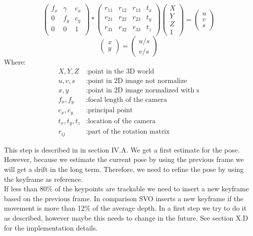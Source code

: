 \documentclass[11pt,a4paper,titlepage,oneside]{report}
\begin{document}
\begin{equation}\label{eq:cm}
  \begin{pmatrix}
		f_x & \gamma & c_x \\
		0 & f_y & c_y \\
		0 & 0 & 1 \\
	\end{pmatrix}*
	\begin{pmatrix}
		r_{11} & r_{12} & r_{13} & t_x \\
		r_{21} & r_{22} & r_{23} & t_y \\
		r_{31} & r_{32} & r_{33} & t_z \\
	\end{pmatrix}
	\begin{pmatrix}
		X \\
		Y \\
		Z \\
		1
	\end{pmatrix}=
	\begin{pmatrix}
		u \\
		v \\
		s
  \end{pmatrix}
\end{equation}
\begin{equation}\label{eq:cm_normalized}
	\begin{pmatrix}
		x \\
		y
	\end{pmatrix}=
	\begin{pmatrix}
		u/s \\
		v/s 
  \end{pmatrix}
\end{equation}
Where:
\begin{align*}
  X,Y,Z			&: \text{point in the 3D world}\\
	u,v,s	   	&: \text{point in 2D image not normalize}\\
	x,y				&: \text{point in 2D image normalized with s}\\
	f_x,f_y  	&: \text{focal length of the camera}\\
  c_x,c_y  	&: \text{principal point}\\
  t_x,t_y,t_z	&: \text{location of the camera}\\
  r_{ij}	&: \text{part of the rotation matrix}
\end{align*}

This step is described in \cite{svo2} in section IV.A. We get a first estimate for the pose. However, because we estimate the current pose by using the previous frame we will get a drift in the long term. Therefore, we need to refine the pose by using the keyframe as reference.\\
If less than 80\% of the keypoints are trackable we need to insert a new keyframe based on the previous frame. In comparison SVO inserts a new keyframe if the movement is more than 12\% of the average depth. In a first step we try to do it as described, however maybe this needs to change in the future. See \cite{svo2} section X.D for the implementation details.
\end{document}
